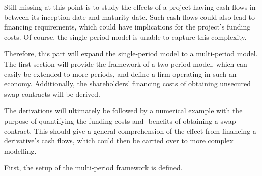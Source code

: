 \documentclass[main.tex]{subfiles}
\begin{document}
    Still missing at this point is to study the effects of a project
    having cash flows in-between its inception date and maturity date.
    Such cash flows could also lead to financing requirements,
    which could have implications for the project's funding costs.
    Of course, the single-period model is unable to capture this complexity.

    Therefore, this part will expand the single-period model to a multi-period model.
    The first section will provide the framework of a two-period model, 
    which can easily be extended to more periods,
    and define a firm operating in such an economy.
    Additionally, the shareholders' financing costs 
    of obtaining unsecured swap contracts will be derived.

    The derivations will ultimately be followed by a numerical example
    with the purpose of quantifying the funding costs and -benefits of obtaining a swap contract.
    This should give a general comprehension of the effect from financing a derivative's cash flows,
    which could then be carried over to more complex modelling.

    First, the setup of the multi-period framework is defined.
\end{document}
